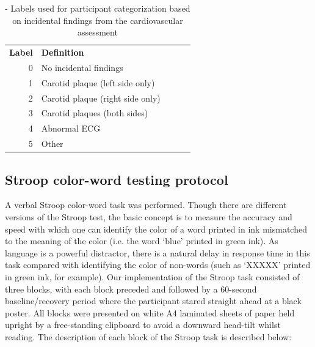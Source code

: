 \documentclass[12pt]{spieman}  %
\begin{document}
\begin{spacing}{2}
\begin{table}[]
\caption{- Labels used for participant categorization based on incidental findings from the cardiovascular assessment}
\begin{center}
\begin{tabular}{|r|l|lll}
\cline{1-2}
\multicolumn{1}{|l|}{\textbf{Label}} & \textbf{Definition}              &  &  &  \\ \cline{1-2}
0                                       & No incidental findings           &  &  &  \\ \cline{1-2}
1                                       & Carotid plaque (left side only)  &  &  &  \\ \cline{1-2}
2                                       & Carotid plaque (right side only) &  &  &  \\ \cline{1-2}
3                                       & Carotid plaques (both sides)     &  &  &  \\ \cline{1-2}
4                                       & Abnormal ECG                     &  &  &  \\ \cline{1-2}
5                                       & Other                            &  &  &  \\ \cline{1-2}
\end{tabular}
\label{table:labels}
\end{center}
\end{table}



\subsection{Stroop color-word testing protocol}
\label{sect:stroop}
A verbal Stroop color-word task was performed. Though there are different versions of the Stroop test, the basic concept is to measure the accuracy and speed with which one can identify the color of a word printed in ink mismatched to the meaning of the color (i.e. the word `blue' printed in green ink). As language is a powerful distractor, there is a natural delay in response time in this task compared with identifying the color of non-words (such as `XXXXX' printed in green ink, for example). Our implementation of the Stroop task consisted of three blocks, with each block preceded and followed by a 60-second baseline/recovery period where the participant stared straight ahead at a black poster. All blocks were presented on white A4 laminated sheets of paper held upright by a free-standing clipboard to avoid a downward head-tilt whilst reading. The description of each block of the Stroop task is described below:
 

\end{spacing}
\end{document}
